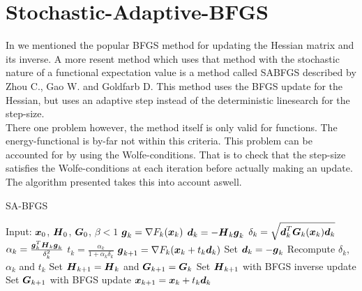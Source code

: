 \section{Stochastic-Adaptive-BFGS\label{sec:stochastic_adaptive_bfgs}}
    In  we mentioned the popular BFGS method for updating the
    Hessian matrix and its inverse. A more resent method which uses that method
    with the stochastic nature of a functional expectation value is a method
    called SABFGS\cite{SABFGS} described by Zhou C., Gao W. and Goldfarb D.
    This method uses the BFGS update for the Hessian, but uses an adaptive step
    instead of the deterministic linesearch for the step-size. \\ 
    There one problem however, the method itself is only valid for
     functions. The energy-functional is by-far not
    within this criteria. This problem can be accounted for by using the
    Wolfe-conditions. That is to check that the step-size satisfies the
    Wolfe-conditions at each iteration before actually making an update. The
    algorithm presented takes this into account aswell.
        \begin{algorithm}[H]
            \caption{SA-BFGS\label{alg:sabfgs}}
            \begin{algorithmic}[H]
                \State Input: $\boldsymbol{{x}}_0$, $\boldsymbol{{H}}_0$, $\boldsymbol{{G}}_0$, $\beta
                < 1$
                    \State $\boldsymbol{{g}}_k = \nabla F_k(\boldsymbol{{x}}_k)$
                    \State $\boldsymbol{{d}}_k = -\boldsymbol{{H}}_k\boldsymbol{{g}}_k$ 
                    \State $\delta_k =
                    \sqrt{\boldsymbol{{d}}^T_k\boldsymbol{{G}}_k(\boldsymbol{{x}}_k)\boldsymbol{{d}}_k}$
                    \State $\alpha_k =
                    \frac{\boldsymbol{{g}}^T_k\boldsymbol{{H}}_k\boldsymbol{{g}}_k}{\delta^2_k}$
                    \State $t_k = \frac{\alpha_k}{1 + \alpha_k\delta_k}$
                    \State $\boldsymbol{{g}}_{k+1} = \nabla F_k(\boldsymbol{{x}}_k +
                    t_k\boldsymbol{{d}}_k)$ 
                     
                    \State Set $\boldsymbol{{d}}_k = -\boldsymbol{{g}}_k$
                    \State Recompute $\delta_k$, $\alpha_k$ and $t_k$
                    \State Set $\boldsymbol{{H}}_{k+1} = \boldsymbol{{H}}_{k}$ and
                    $\boldsymbol{{G}}_{k+1} = \boldsymbol{{G}}_{k}$
                    \Else
                    \State Set $\boldsymbol{{H}}_{k+1}$ with BFGS inverse update
                    \State Set $\boldsymbol{{G}}_{k+1}$ with BFGS update
                    \EndIf
                    \State $\boldsymbol{{x}}_{k+1} = \boldsymbol{{x}}_k + t_k\boldsymbol{{d}}_k$
                \EndFor
            \end{algorithmic}
        \end{algorithm}

